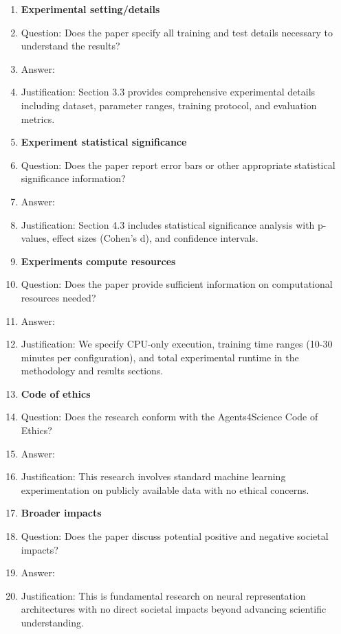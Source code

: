 \documentclass{article}
\begin{document}
\begin{enumerate}
\item {\bf Experimental setting/details}
    \item[] Question: Does the paper specify all training and test details necessary to understand the results?
    \item[] Answer: \answerYes{}
    \item[] Justification: Section 3.3 provides comprehensive experimental details including dataset, parameter ranges, training protocol, and evaluation metrics.

\item {\bf Experiment statistical significance}
    \item[] Question: Does the paper report error bars or other appropriate statistical significance information?
    \item[] Answer: \answerYes{}
    \item[] Justification: Section 4.3 includes statistical significance analysis with p-values, effect sizes (Cohen's d), and confidence intervals.

\item {\bf Experiments compute resources}
    \item[] Question: Does the paper provide sufficient information on computational resources needed?
    \item[] Answer: \answerYes{}
    \item[] Justification: We specify CPU-only execution, training time ranges (10-30 minutes per configuration), and total experimental runtime in the methodology and results sections.

\item {\bf Code of ethics}
    \item[] Question: Does the research conform with the Agents4Science Code of Ethics?
    \item[] Answer: \answerYes{}
    \item[] Justification: This research involves standard machine learning experimentation on publicly available data with no ethical concerns.

\item {\bf Broader impacts}
    \item[] Question: Does the paper discuss potential positive and negative societal impacts?
    \item[] Answer: \answerNA{}
    \item[] Justification: This is fundamental research on neural representation architectures with no direct societal impacts beyond advancing scientific understanding.

\end{enumerate}
\end{document}
